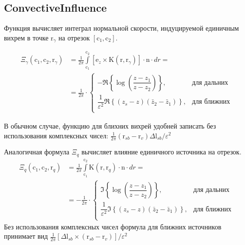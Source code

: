 \documentclass[14pt]{extreport}
\newcommand{\br}[1]{\boldsymbol{\mathrm{#1}}}
\renewcommand{\vec}[1]{\br{#1}}
\begin{document}
\subsection{ConvectiveInfluence}
\label{ConvectiveInfluence}
Функция вычисляет интеграл нормальной скорости, индуцируемой единичным вихрем 
в точке $\vec r_\gamma$ на отрезок $[\vec c_1, \vec c_2]$.

\begin{equation}
\label{eq_VortexInfluence}
\begin{split}
\Xi_\gamma(\vec c_1, \vec c_2, \vec r_\gamma)
&= \frac{1}{2\pi} \int\limits_{\vec c_1}^{\vec c_2} [\vec e_z \times \vec K(\vec r,\vec r_\gamma)] \cdot \vec n \cdot dr
= \\ &= \frac{1}{2\pi} \cdot
\begin{cases}
-\Re \left\lbrace \log \left(\dfrac{z-z_1}{z-z_2}\right) \right\rbrace,	&\text{для дальних}\\
\dfrac{1}{\varepsilon^2}\Re \left\lbrace (z_s-z)(\bar z_2 - \bar z_1) \right\rbrace, 	&\text{для ближних}\\
\end{cases}
\end{split}
\end{equation}
\begin{center}\end{center}

В обычном случае, функцию для блихних вихрей удобней записать без использования
комплексных чисел:
$\frac{1}{2\pi} (\vec r_{sb} - \vec r_v) \Delta\vec l_{sb} / \varepsilon^2$

Аналогичная формула $\Xi_q$ вычисляет влияние единичного источника на отрезок.
\begin{equation}
\label{eq_SourceInfluence}
\begin{split}
\Xi_q (\vec c_1, \vec c_2, \vec r_q)
&= \frac{1}{2\pi} \int\limits_{\vec c_1}^{\vec c_2} \vec K(\vec r, \vec r_q) \cdot \vec n \cdot dr
= \\ & = -\frac{1}{2\pi} \cdot
\begin{cases}
\Im \left\lbrace \log \left(\dfrac{z-z_1}{z-z_2}\right) \right\rbrace,	&\text{для дальних}\\
\dfrac{1}{\varepsilon^2}\Im \left\lbrace (z_s-z)(\bar z_2 - \bar z_1) \right\rbrace, 	&\text{для ближних}\\
\end{cases}
\end{split}
\end{equation}
Без использования комплексных чисел формула для ближних источников принимает вид
$\frac{1}{2\pi} [\Delta \vec l_{sb} \times (\vec r_{sb} - \vec r_v)]/\varepsilon^2$
\end{document}
